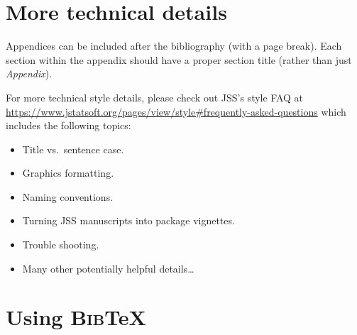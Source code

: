 \documentclass[article]{jss}
\begin{document}





\newpage

\begin{appendix}

\section{More technical details} \label{app:technical}

\begin{leftbar}
Appendices can be included after the bibliography (with a page break). Each
section within the appendix should have a proper section title (rather than
just \emph{Appendix}).

For more technical style details, please check out JSS's style FAQ at
\url{https://www.jstatsoft.org/pages/view/style#frequently-asked-questions}
which includes the following topics:
\begin{itemize}
  \item Title vs.\ sentence case.
  \item Graphics formatting.
  \item Naming conventions.
  \item Turning JSS manuscripts into  package vignettes.
  \item Trouble shooting.
  \item Many other potentially helpful details\dots
\end{itemize}
\end{leftbar}


\section[Using BibTeX]{Using \textsc{Bib}{\TeX}} \label{app:bibtex}


\end{appendix}
\end{document}
